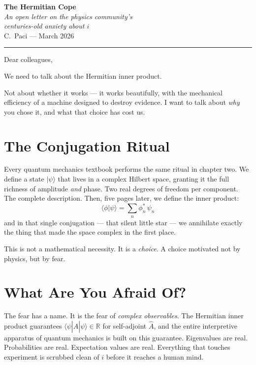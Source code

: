 \documentclass[11pt]{article}
\begin{document}
\begin{center}
{\LARGE\bfseries The Hermitian Cope}\\[6pt]
{\large\itshape An open letter on the physics community's \\
centuries-old anxiety about $i$}\\[12pt]
{\normalsize C.\ Paci \quad --- \quad March 2026}
\end{center}

\vspace{1em}

\noindent\rule{\textwidth}{0.4pt}

\vspace{0.5em}

Dear colleagues,

We need to talk about the Hermitian inner product.

Not about whether it works --- it works beautifully, with the mechanical efficiency of a machine designed to destroy evidence. I want to talk about \textit{why} you chose it, and what that choice has cost us.

\section*{The Conjugation Ritual}

Every quantum mechanics textbook performs the same ritual in chapter two. We define a state $|\psi\rangle$ that lives in a complex Hilbert space, granting it the full richness of amplitude \textit{and} phase. Two real degrees of freedom per component. The complete description. Then, five pages later, we define the inner product:
\[
\langle \phi | \psi \rangle = \sum_n \phi_n^* \, \psi_n
\]
and in that single conjugation --- that silent little star --- we annihilate exactly the thing that made the space complex in the first place.

This is not a mathematical necessity. It is a \textit{choice}. A choice motivated not by physics, but by fear.

\section*{What Are You Afraid Of?}

The fear has a name. It is the fear of \textit{complex observables}. The Hermitian inner product guarantees $\langle \psi | \hat{A} | \psi \rangle \in \mathbb{R}$ for self-adjoint $\hat{A}$, and the entire interpretive apparatus of quantum mechanics is built on this guarantee. Eigenvalues are real. Probabilities are real. Expectation values are real. Everything that touches experiment is scrubbed clean of $i$ before it reaches a human mind.
\end{document}
